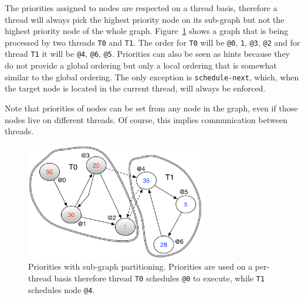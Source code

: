 The priorities assigned to nodes are respected on a thread basis, therefore a
thread will always pick the highest priority node on its sub-graph but not the
highest priority node of the whole graph.
Figure~\ref{fig:coordination:priorities} shows a graph that is being processed
by two threads \texttt{T0} and \texttt{T1}. The order for \texttt{T0} will be
\texttt{@0}, \texttt{1}, \texttt{@3}, \texttt{@2} and for thread \texttt{T1} it
will be \texttt{@4}, \texttt{@6}, \texttt{@5}.  Priorities can also be seen as
hints because they do not provide a global ordering but only a local ordering
that is somewhat similar to the global ordering. The only exception is
\texttt{schedule-next}, which, when the target node is located in the current
thread, will always be enforced.

Note that priorities of nodes can be set from any node in the graph, even if those nodes
live on different threads. Of course, this implies communication between
threads.

\begin{figure}
\begin{center}
   \includegraphics[width=0.7\textwidth]{figures/coordination/priorities.pdf}
\end{center}
\caption{Priorities with sub-graph partitioning. Priorities are used on a
   per-thread basis therefore thread \texttt{T0} schedules \texttt{@0} to
   execute, while \texttt{T1} schedules node \texttt{@4}.}
\label{fig:coordination:priorities}
\end{figure}
